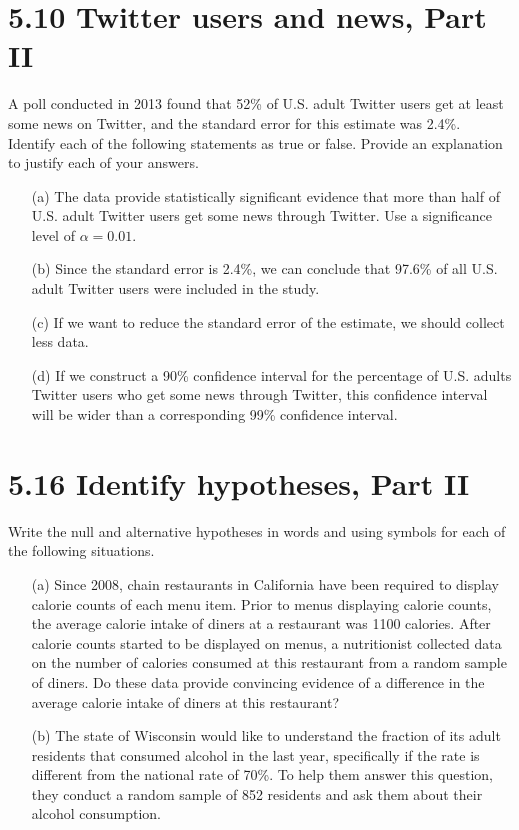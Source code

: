 \documentclass{article}
\begin{document}
\section*{5.10 Twitter users and news, Part II}
A poll conducted in 2013 found that 52\% of U.S. adult Twitter users get at least some news on Twitter, and the standard error for this estimate was 2.4\%. Identify each of the following statements as true or false. Provide an explanation to justify each of your answers.
\begin{itemize}
    \item[(a)] The data provide statistically significant evidence that more than half of U.S. adult Twitter users get some news through Twitter. Use a significance level of \(\alpha = 0.01\). 
    \item[(b)] Since the standard error is 2.4\%, we can conclude that 97.6\% of all U.S. adult Twitter users were included in the study.
    \item[(c)] If we want to reduce the standard error of the estimate, we should collect less data.
    \item[(d)] If we construct a 90\% confidence interval for the percentage of U.S. adults Twitter users who get some news through Twitter, this confidence interval will be wider than a corresponding 99\% confidence interval.
\end{itemize}


\section*{5.16 Identify hypotheses, Part II}
Write the null and alternative hypotheses in words and using symbols for each of the following situations.
\begin{itemize}
    \item[(a)] Since 2008, chain restaurants in California have been required to display calorie counts of each menu item. Prior to menus displaying calorie counts, the average calorie intake of diners at a restaurant was 1100 calories. After calorie counts started to be displayed on menus, a nutritionist collected data on the number of calories consumed at this restaurant from a random sample of diners. Do these data provide convincing evidence of a difference in the average calorie intake of diners at this restaurant?
    \item[(b)] The state of Wisconsin would like to understand the fraction of its adult residents that consumed alcohol in the last year, specifically if the rate is different from the national rate of 70\%. To help them answer this question, they conduct a random sample of 852 residents and ask them about their alcohol consumption.
\end{itemize}
\end{document}
